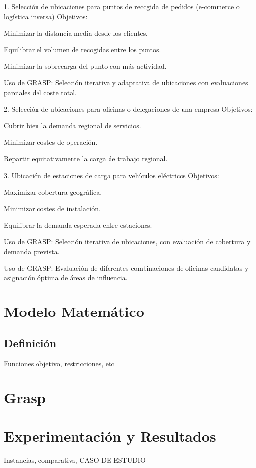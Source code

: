 \documentclass[12pt,a4paper]{book}
\begin{document}
1. Selección de ubicaciones para puntos de recogida de pedidos (e-commerce o logística inversa)
Objetivos:

Minimizar la distancia media desde los clientes.

Equilibrar el volumen de recogidas entre los puntos.

Minimizar la sobrecarga del punto con más actividad.

Uso de GRASP: Selección iterativa y adaptativa de ubicaciones con evaluaciones parciales del coste total.

2. Selección de ubicaciones para oficinas o delegaciones de una empresa
Objetivos:

Cubrir bien la demanda regional de servicios.

Minimizar costes de operación.

Repartir equitativamente la carga de trabajo regional.

3. Ubicación de estaciones de carga para vehículos eléctricos
Objetivos:

Maximizar cobertura geográfica.

Minimizar costes de instalación.

Equilibrar la demanda esperada entre estaciones.

Uso de GRASP: Selección iterativa de ubicaciones, con evaluación de cobertura y demanda prevista.

Uso de GRASP: Evaluación de diferentes combinaciones de oficinas candidatas y asignación óptima de áreas de influencia.
\chapter{Modelo Matemático}

\section{Definición}
Funciones objetivo, restricciones, etc

\chapter{Grasp}




\chapter{Experimentación y Resultados}

Instancias, comparativa, CASO DE ESTUDIO
\end{document}
